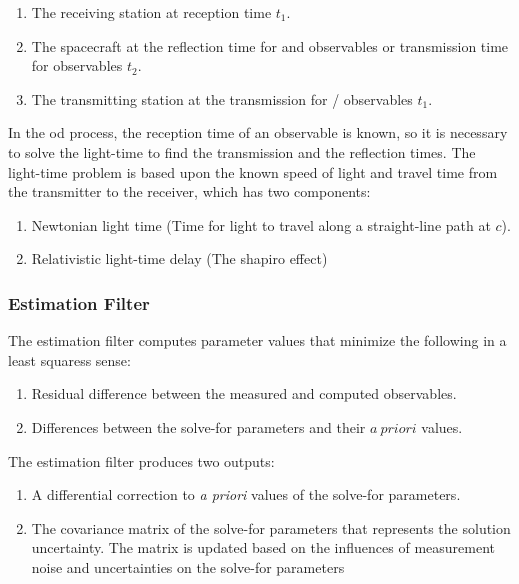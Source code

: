 \documentclass[oneside]{book}
\theoremstyle{mystyle}
\begin{document}
\begin{enumerate}[itemsep=0pt]
    \item The receiving station at reception time $t_1$.
    \item The spacecraft at the reflection time for  and  observables or transmission time for  observables $t_2$.
    \item The transmitting station at the transmission for / observables $t_1$.
\end{enumerate}

In the \gls{od} process, the reception time of an observable is known, so it is necessary to solve the light-time to find the transmission and the reflection times. The light-time
problem is based upon the known speed of light and travel time from the transmitter to the receiver, which has two components:

\begin{enumerate}[itemsep=0pt]
    \item Newtonian light time (Time for light to travel along a straight-line path at $c$).
    \item Relativistic light-time delay (The \gls{shapiro effect})
\end{enumerate}

\subsubsection{\footnotesize Estimation Filter}

The estimation filter computes parameter values that minimize the following in a \glspl{least squares} sense:
\begin{enumerate}[itemsep=0pt]
\item Residual difference between the measured and computed observables.
\item Differences between the solve-for parameters and their $a\ priori$ values.
\end{enumerate}

The estimation filter produces two outputs:

\begin{enumerate}[itemsep=0pt]
    \item A differential correction to \textit{a priori} values of the \gls{solve-for parameters}.
    \item The \gls{covariance matrix} of the \gls{solve-for parameters} that represents the solution uncertainty. The matrix is updated based on the influences of measurement noise and  uncertainties on the \gls{solve-for parameters}
\end{enumerate}
\end{document}
